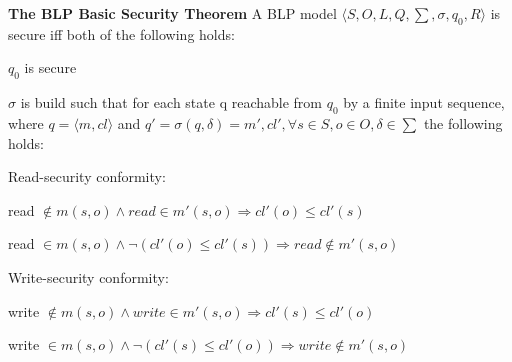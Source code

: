 \documentclass[a4paper]{article}
\renewcommand{\note}[2]{\begin{noteBox} \textbf{#1} #2 \end{noteBox}}
\begin{document}
\begin{multicols}{3}
    \note{The BLP Basic Security Theorem}{A BLP model $⟨S,O,L,Q,\sum,\sigma,q_0,R⟩$ is secure iff both of the following holds:
        \begin{enumerate*}
            \item $q_0$ is secure
            \item $\sigma$ is build such that for each state q reachable from $q_0$ by a finite input sequence, where $q=⟨m,cl⟩$ and $q'=\sigma(q,\delta)=m',cl',\forall s\in S, o\in O,\delta\in\sum$ the following holds:
        \end{enumerate*}
        \begin{itemize*}
            \item Read-security conformity:
            \begin{itemize*}
                \item read $\not\in m(s,o)\wedge read\in m'(s,o)\Rightarrow cl'(o)\leq cl'(s)$
                \item read $\in m(s,o) \wedge\lnot (cl'(o)\leq cl'(s)) \Rightarrow read \not\in m'(s,o)$
            \end{itemize*}
            \item Write-security conformity:
            \begin{itemize*}
                \item write $\not\in m(s,o)\wedge write \in m'(s,o)\Rightarrow cl'(s)\leq cl'(o)$
                \item write $\in m(s,o)\wedge\lnot(cl'(s)\leq cl'(o)) \Rightarrow write \not\in m'(s,o)$
            \end{itemize*}
        \end{itemize*}
    }


\end{multicols}
\end{document}
